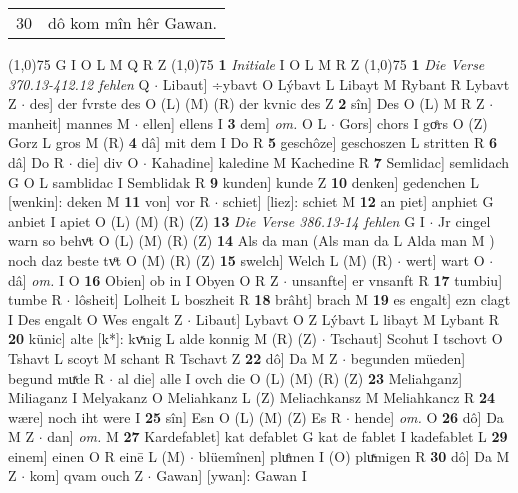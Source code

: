 \documentclass[8pt,a4paper,notitlepage]{article}
\begin{document}
\begin{table}[ht]
\begin{minipage}[t]{0.5\linewidth}
\begin{tabular}{rl}
30 & dô kom mîn hêr Gawan.\\ 
\end{tabular}
\scriptsize
\line(1,0){75} \newline
G I O L M Q R Z \newline
\line(1,0){75} \newline
\textbf{1} \textit{Initiale} I O L M R Z  \newline
\line(1,0){75} \newline
\textbf{1} \textit{Die Verse 370.13-412.12 fehlen} Q   $\cdot$ Libaut] ÷ybavt O Lýbavt L Libayt M Rybant R Lybavt Z  $\cdot$ des] der fvrste des O (L) (M) (R) der kvnic des Z \textbf{2} sîn] Des O (L) M R Z  $\cdot$ manheit] mannes M  $\cdot$ ellen] ellens I \textbf{3} dem] \textit{om.} O L  $\cdot$ Gors] chors I goͤrs O (Z) Gorz L gros M (R) \textbf{4} dâ] mit dem I Do R \textbf{5} geschôze] geschoszen L stritten R \textbf{6} dâ] Do R  $\cdot$ die] div O  $\cdot$ Kahadine] kaledine M Kachedine R \textbf{7} Semlidac] semlidach G O L samblidac I Semblidak R \textbf{9} kunden] kunde Z \textbf{10} denken] gedenchen L [wenkin]: deken M \textbf{11} von] vor R  $\cdot$ schiet] [liez]: schiet M \textbf{12} an piet] anphiet G anbiet I apiet O (L) (M) (R) (Z) \textbf{13} \textit{Die Verse 386.13-14 fehlen} G I   $\cdot$ Jr cingel warn so behvͦt O (L) (M) (R) (Z) \textbf{14} Als da man (Als man da L Alda man M ) noch daz beste tvͦt O (M) (R) (Z) \textbf{15} swelch] Welch L (M) (R)  $\cdot$ wert] wart O  $\cdot$ dâ] \textit{om.} I O \textbf{16} Obien] ob in I Obyen O R Z  $\cdot$ unsanfte] er vnsanft R \textbf{17} tumbiu] tumbe R  $\cdot$ lôsheit] Lolheit L boszheit R \textbf{18} brâht] brach M \textbf{19} es engalt] ezn clagt I Des engalt O Wes engalt Z  $\cdot$ Libaut] Lybavt O Z Lýbavt L libayt M Lybant R \textbf{20} künic] alte [k*]: kvͯnig L alde konnig M (R) (Z)  $\cdot$ Tschaut] Scohut I tschovt O Tshavt L scoyt M schant R Tschavt Z \textbf{22} dô] Da M Z  $\cdot$ begunden müeden] begund muͯde R  $\cdot$ al die] alle I ovch die O (L) (M) (R) (Z) \textbf{23} Meliahganz] Miliaganz I Melyakanz O Meliahkanz L (Z) Meliachkansz M Meliahkancz R \textbf{24} wære] noch iht were I \textbf{25} sîn] Esn O (L) (M) (Z) Es R  $\cdot$ hende] \textit{om.} O \textbf{26} dô] Da M Z  $\cdot$ dan] \textit{om.} M \textbf{27} Kardefablet] kat defablet G kat de fablet I kadefablet L \textbf{29} einem] einen O R einē L (M)  $\cdot$ blüemînen] pluͤmen I (O) pluͯmigen R \textbf{30} dô] Da M Z  $\cdot$ kom] qvam ouch Z  $\cdot$ Gawan] [ywan]: Gawan I \newline
\end{minipage}

\end{table}
\end{document}
